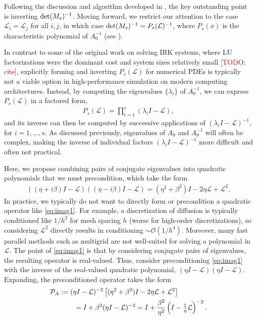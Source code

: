 \documentclass[review]{siamart}
\makeatletter
\newcommand{\todo}[1]{\textcolor{red}{[TODO\@: #1]}}
\makeatother
\begin{document}
Following the discussion and algorithm developed in , the key
outstanding point is inverting $\textnormal{det}({M}_s)^{-1}$. Moving forward, we
restrict our attention to the case $\mathcal{L}_i = \mathcal{L}_j$ for all $i,j$,
in which case $\textnormal{det}({M}_s)^{-1} = P_s(\mathcal{L})^{-1}$, where
$P_s(x)$ is the characteristic polynomial of $A_0^{-1}$ (see ).

In contrast to some of the original work on solving IRK systems, where LU factorizations
were the dominant cost and system sizes relatively small \todo{cite}, explicitly forming and inverting
$P_s(\mathcal{L})$ for numerical PDEs is typically not a viable option in high-performance
simulation on modern computing architectures. Instead, by computing the eigenvalues
$\{\lambda_i\}$ of $A_0^{-1}$, we can express $P_s(\mathcal{L})$ in a factored form, 
%
\begin{align}\label{eq:fac}
P_s(\mathcal{L}) = \prod_{i=1}^s (\lambda_i I - \mathcal{L}),
\end{align}
%
and its inverse can then be computed by successive applications of $(\lambda_iI - \mathcal{L})^{-1}$,
for $i=1,...,s$. As discussed previously, eigenvalues of $A_0$ and $A_0^{-1}$ will often be
complex, making the inverse of individual factors $(\lambda_iI - \mathcal{L})^{-1}$ more
difficult and often not practical. 

Here, we propose combining pairs of conjugate eigenvalues into quadratic polynomials
that we must precondition, which take the form 
%
\begin{align}\label{eq:imag1}
((\eta + i\beta)I - \mathcal{L})((\eta - i\beta)I - \mathcal{L}) =
	(\eta^2+\beta^2)I - 2\eta \mathcal{L} + \mathcal{L}^2.
\end{align}
%
In practice, we typically do not want to directly form or precondition a quadratic
operator like \eqref{eq:imag1}. For example, a discretization of diffusion is typically 
conditioned like $1/h^2$ for mesh spacing $h$ (worse for high-order discretizations),
so considering $\mathcal{L}^2$ directly results in conditioning $\sim\mathcal{O}(1/h^4)$.
Moreover, many fast parallel methods such as multigrid are not well-suited for solving
a polynomial in $\mathcal{L}$. The point of \eqref{eq:imag1} is that by considering
conjugate pairs of eigenvalues, the resulting operator is real-valued. Thus, consider
preconditioning \eqref{eq:imag1} with the inverse of the real-valued quadratic polynomial,
$(\eta I - \mathcal{L})(\eta I - \mathcal{L})$. Expanding, the preconditioned operator
takes the form
%
\begin{align}\nonumber
\mathcal{P}_A & := (\eta I - \mathcal{L})^{-2}\left[(\eta^2+\beta^2)I - 2\eta \mathcal{L} + \mathcal{L}^2\right] \\
&\hspace{5ex} = I + \beta^2(\eta I - \mathcal{L})^{-2}
= I + \frac{\beta^2}{\eta^2}\left(I - \tfrac{1}{\eta}\mathcal{L}\right)^{-2}.\label{eq:prec1}
\end{align}
%
\end{document}

